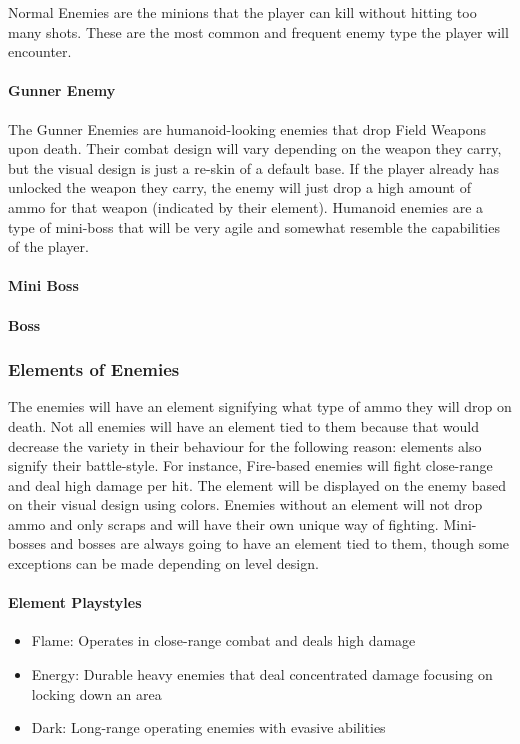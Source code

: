 \documentclass[12pt]{article}
\begin{document}
Normal Enemies are the minions that the player can kill without hitting too many shots. These are the most common and frequent enemy type the player will encounter. 

\paragraph{Gunner Enemy}

The Gunner Enemies are humanoid-looking enemies that drop Field Weapons upon death. Their combat design will vary depending on the weapon they carry, but the visual design is just a re-skin of a default base. If the player already has unlocked the weapon they carry, the enemy will just drop a high amount of ammo for that weapon (indicated by their element). Humanoid enemies are a type of mini-boss that will be very agile and somewhat resemble the capabilities of the player.

\paragraph{Mini Boss}

\paragraph{Boss}

\subsubsection{Elements of Enemies}

The enemies will have an element signifying what type of ammo they will drop on death. Not all enemies will have an element tied to them because that would decrease the variety in their behaviour for the following reason: elements also signify their battle-style. For instance, Fire-based enemies will fight close-range and deal high damage per hit. The element will be displayed on the enemy based on their visual design using colors. Enemies without an element will not drop ammo and only scraps and will have their own unique way of fighting. Mini-bosses and bosses are always going to have an element tied to them, though some exceptions can be made depending on level design. 

\paragraph{Element Playstyles}

\begin{itemize}
	\item Flame: Operates in close-range combat and deals high damage
	\item Energy: Durable heavy enemies that deal concentrated damage focusing on locking down an area
	\item Dark: Long-range operating enemies with evasive abilities
\end{itemize}
\end{document}
